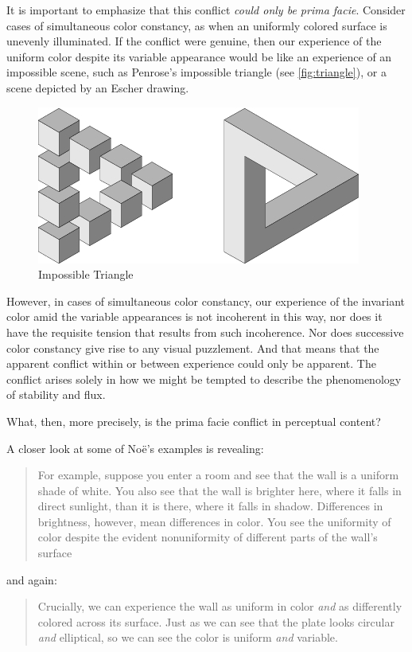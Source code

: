 \documentclass[12pt]{article}
\begin{document}
It is important to emphasize that this conflict \emph{could only be prima facie}. Consider cases of simultaneous color constancy, as when an uniformly colored surface is unevenly illuminated. If the conflict were genuine, then our experience of the uniform color despite its variable appearance would be like an experience of an impossible scene, such as Penrose's \citeyearpar{Penrose:1958kx} impossible triangle (see \autoref{fig:triangle}), or a scene depicted by an Escher drawing.
	\begin{figure}[htbp]
		\centering
			\includegraphics[scale=1]{triangle.jpg}
		\caption{Impossible Triangle}
		\label{fig:triangle}
	\end{figure}
However, in cases of simultaneous color constancy, our experience of the invariant color amid the variable appearances is not incoherent in this way, nor does it have the requisite tension that results from such incoherence. Nor does successive color constancy give rise to any visual puzzlement. And that means that the apparent conflict within or between experience could only be apparent. The conflict arises solely in how we might be tempted to describe the phenomenology of stability and flux. 

What, then, more precisely, is the prima facie conflict in perceptual content? 

A closer look at some of Noë's examples is revealing:
	\begin{quote}
		For example, suppose you enter a room and see that the wall is a uniform shade of white. You also see that the wall is brighter here, where it falls in direct sunlight, than it is there, where it falls in shadow. Differences in brightness, however, mean differences in color. You see the uniformity of color despite the evident nonuniformity of different parts of the wall's surface \citep[127]{Noe:2004fk}
	\end{quote}
and again:
	\begin{quote}
		Crucially, we can experience the wall as uniform in color \emph{and} as differently colored across its surface. Just as we can see that the plate looks circular \emph{and} elliptical, so we can see the color is uniform \emph{and} variable. \citep[129]{Noe:2004fk}
	\end{quote}
\end{document}

